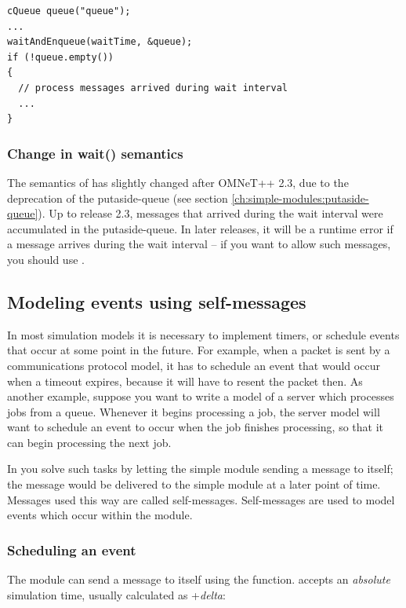 \begin{verbatim}
cQueue queue("queue");
...
waitAndEnqueue(waitTime, &queue);
if (!queue.empty())
{
  // process messages arrived during wait interval
  ...
}
\end{verbatim}


\subsubsection{Change in wait() semantics}

The semantics of  has slightly changed after OMNeT++ 2.3,
due to the deprecation of the putaside-queue
(see section \ref{ch:simple-modules:putaside-queue}).
Up to release 2.3, messages that arrived during the wait interval
were accumulated in the putaside-queue. In later releases,
it will be a runtime error if a message arrives during the wait interval --
if you want to allow such messages, you should use .



\subsection{Modeling events using self-messages}
\label{sec:ch-sim-lib:self-messages}

In most simulation models it is necessary to implement timers,
or schedule events that occur at some point in the future.
For example, when a packet is sent by a communications protocol model,
it has to schedule an event that would occur when a timeout expires,
because it will have to resent the packet then.
As another example, suppose you want to write a model of a server which
processes jobs from a queue. Whenever it begins processing
a job, the server model will want to schedule an event to occur
when the job finishes processing, so that it can begin processing
the next job.

In {\opp} you solve such tasks by letting the simple module
sending a message to itself; the message would be delivered
to the simple module at a later point of time. Messages used
this way are called self-messages.
Self-messages are used to model events which occur within the module.

\subsubsection{Scheduling an event}

The module can send a message to itself using the  function.
 accepts an \textit{absolute} simulation time,
usually calculated as +\textit{delta}:

